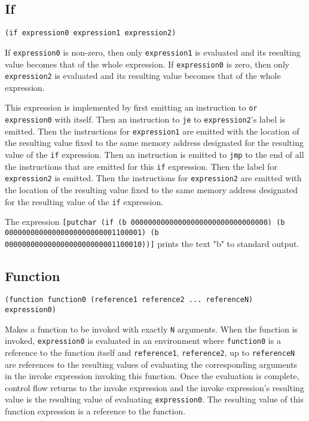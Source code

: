 \documentclass[twocolumn,landscape]{article}
\begin{document}
    \subsection{If}\label{sec:if}
      \begin{lstlisting}
(if expression0 expression1 expression2)
      \end{lstlisting}
      If \lstinline{expression0} is non-zero, then only \lstinline{expression1} is evaluated and its resulting value becomes that of the whole expression. If \lstinline{expression0} is zero, then only \lstinline{expression2} is evaluated and its resulting value becomes that of the whole expression.

      This expression is implemented by first emitting an instruction to \lstinline{or} \lstinline{expression0} with itself. Then an instruction to \lstinline{je} to \lstinline{expression2}'s label is emitted. Then the instructions for \lstinline{expression1} are emitted with the location of the resulting value fixed to the same memory address designated for the resulting value of the \lstinline{if} expression. Then an instruction is emitted to \lstinline{jmp} to the end of all the instructions that are emitted for this \lstinline{if} expression. Then the label for \lstinline{expression2} is emitted. Then the instructions for \lstinline{expression2} are emitted with the location of the resulting value fixed to the same memory address designated for the resulting value of the \lstinline{if} expression.

      The expression \lstinline{[putchar (if (b 00000000000000000000000000000000) (b 00000000000000000000000001100001) (b 00000000000000000000000001100010))]} prints the text "b" to standard output.

    \subsection{Function}\label{sec:function}
      \begin{lstlisting}
(function function0 (reference1 reference2 ... referenceN) expression0)
      \end{lstlisting}
      Makes a function to be invoked with exactly \lstinline{N} arguments. When the function is invoked, \lstinline{expression0} is evaluated in an environment where \lstinline{function0} is a reference to the function itself and \lstinline{reference1}, \lstinline{reference2}, up to \lstinline{referenceN} are references to the resulting values of evaluating the corresponding arguments in the invoke expression invoking this function. Once the evaluation is complete, control flow returns to the invoke expression and the invoke expression's resulting value is the resulting value of evaluating \lstinline{expression0}. The resulting value of this function expression is a reference to the function.
\end{document}
